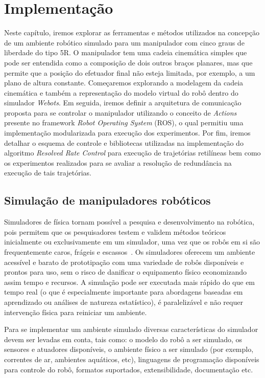 \chapter{Implementação}\label{cap:methods}

Neste capítulo, iremos explorar as ferramentas e métodos utilizados na
concepção de um ambiente robótico simulado para um manipulador com cinco graus
de liberdade do tipo 5R. O manipulador tem uma cadeia cinemática simples que
pode ser entendida como a composição de dois outros braços planares, mas que
permite que a posição do efetuador final não esteja limitada, por exemplo, a um
plano de altura constante. Começaremos explorando a modelagem da cadeia
cinemática e também a representação do modelo virtual do robô dentro do
simulador \emph{Webots}. Em seguida, iremos definir a arquitetura de
comunicação proposta para se controlar o manipulador utilizando o conceito de
\emph{Actions} presente no framework \emph{Robot Operating System} (ROS), o
qual permitiu uma implementação modularizada para execução dos experimentos.
Por fim, iremos detalhar o esquema de controle e bibliotecas utilizadas na
implementação do algoritmo \emph{Resolved Rate Control} para execução de
trajetórias retilíneas bem como os experimentos realizados para se avaliar a
resolução de redundância na execução de tais trajetórias.

\section{Simulação de manipuladores robóticos}

Simuladores de física tornam possível a pesquisa e desenvolvimento na robótica,
pois permitem que os pesquisadores testem e validem métodos teóricos
inicialmente ou exclusivamente em um simulador, uma vez que os robôs em si são
frequentemente caros, frágeis e escassos~\cite{robotic_applications}. Os
simuladores oferecem um ambiente acessível e barato de prototipação com uma
variedade de robôs disponíveis e prontos para uso, sem o risco de danificar o
equipamento físico economizando assim tempo e recursos. A simulação pode ser
executada mais rápido do que em tempo real (o que é especialmente importante
para abordagens baseadas em aprendizado ou análises de natureza estatístico), é
paralelizável e não requer intervenção física para reiniciar um ambiente.

Para se implementar um ambiente simulado diversas características do simulador
devem ser levadas em conta, tais como: o modelo do robô a ser simulado, os
sensores e atuadores disponíveis, o ambiente físico a ser simulado (por
exemplo, correntes de ar, ambientes aquáticos, etc), linguagens de programação
disponíveis para controle do robô, formatos suportados, extensibilidade,
documentação etc.

